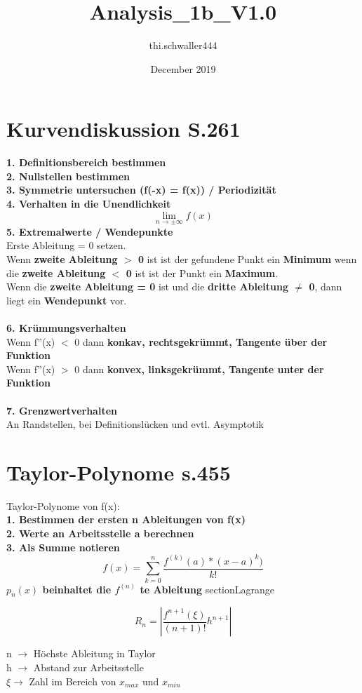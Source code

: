 \documentclass{article}
\title{Analysis_1b_V1.0}
\author{thi.schwaller444 }
\date{December 2019}
\begin{document}
\section{Kurvendiskussion S.261}
\textbf{1. Definitionsbereich bestimmen} \\
\textbf{2. Nullstellen bestimmen} \\
\textbf{3. Symmetrie untersuchen (f(-x) = f(x)) / Periodizität} \\
\textbf{4. Verhalten in die Unendlichkeit}
\begin{equation*}
    \lim\limits_{n \rightarrow \pm \infty}{f(x)}
\end{equation*}
\textbf{5. Extremalwerte / Wendepunkte} \\
Erste Ableitung = 0 setzen.\\
Wenn \textbf{zweite Ableitung $>$ 0} ist ist der gefundene Punkt ein \textbf{Minimum} wenn die \textbf{zweite Ableitung $<$ 0} ist ist der Punkt ein \textbf{Maximum}. \\
Wenn die \textbf{zweite Ableitung = 0} ist und die \textbf{dritte Ableitung $\neq$ 0}, dann liegt ein \textbf{Wendepunkt} vor. \\ \\
\textbf{6. Krümmungsverhalten} \\
Wenn f''(x) $<$ 0 dann \textbf{konkav, rechtsgekrümmt, Tangente über der Funktion} \\
Wenn f''(x) $>$ 0 dann \textbf{konvex, linksgekrümmt, Tangente unter der Funktion} \\ \\
\textbf{7. Grenzwertverhalten}\\
An Randstellen, bei Definitionslücken und evtl. Asymptotik
\section{Taylor-Polynome s.455}
Taylor-Polynome von f(x): \\
\textbf{1. Bestimmen der ersten n Ableitungen von f(x)} \\
\textbf{2. Werte an Arbeitsstelle a berechnen} \\
\textbf{3. Als Summe notieren} \\
\begin{equation*}
    f(x) = \sum_{k=0}^n \frac{f^{(k)}(a) * (x - a)^k)}{k!}
\end{equation*}
\textbf{$p_n(x)$ beinhaltet die $f^{(n)}$ te Ableitung}
\sub section{Lagrange}
\begin{multicols}{2}
\begin{equation*}
    R_n = | \frac{f^{n+1}(\xi)}{(n + 1)!}h^{n+1} |
\end{equation*}
\columnbreak
\begin{center}
    n $\rightarrow$ Höchste Ableitung in  Taylor \\
h $\rightarrow$ Abstand zur Arbeitsstelle \\
$\xi \rightarrow$ Zahl im Bereich von $x_{max}$ und $x_{min}$
\end{center}
\end{multicols}
\end{document}
